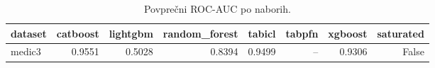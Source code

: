 \begin{table}[htbp]
\centering
\caption{Povprečni ROC-AUC po naborih.}
\label{tab:pivot}
\begin{tabular}{lrrrrrrr}
\hline
dataset & catboost & lightgbm & random\_forest & tabicl & tabpfn & xgboost & saturated \\
\hline
medic3 & 0.9551 & 0.5028 & 0.8394 & 0.9499 & -- & 0.9306 & False \\
\hline
\end{tabular}
\end{table}
